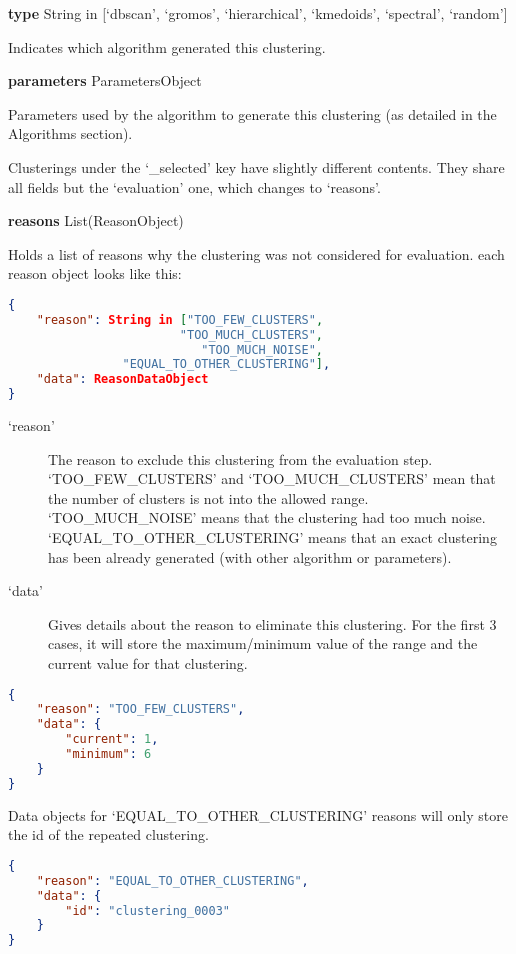 \textbf{type} String in {[}`dbscan', `gromos', `hierarchical', `kmedoids',
`spectral', `random'{]}

Indicates which algorithm generated this clustering.

\textbf{parameters} ParametersObject

Parameters used by the algorithm to generate this clustering (as detailed
in the Algorithms section).

Clusterings under the `\_selected' key have slightly different
contents. They share all fields but the `evaluation' one, which changes
to `reasons'.

\textbf{reasons } List(ReasonObject)

Holds a list of reasons why the clustering was not considered for
evaluation. each reason object looks like this:

\begin{lstlisting}[caption={Reason object},
firstnumber=1, 
language=json, 
breakatwhitespace=true 
%,literate={\_}{}{0\discretionary{_}{\\}{}}
]
{
    "reason": String in ["TOO_FEW_CLUSTERS",
                        "TOO_MUCH_CLUSTERS", 
                           "TOO_MUCH_NOISE",
                "EQUAL_TO_OTHER_CLUSTERING"],
    "data": ReasonDataObject
}
\end{lstlisting}

\begin{description}
	\item [`reason'] The reason to exclude this clustering from the evaluation
	step. `TOO\_FEW\_CLUSTERS' and `TOO\_MUCH\_CLUSTERS' mean that the
	number of clusters is not into the allowed range. `TOO\_MUCH\_NOISE'
	means that the clustering had too much noise. `EQUAL\_TO\_OTHER\_CLUSTERING'
	means that an exact clustering has been already generated (with other
	algorithm or parameters).
	\item [`data'] Gives details about the reason to eliminate this clustering.
	For the first 3 cases, it will store the maximum/minimum value of the
	range and the current value for that clustering.
\end{description}

\begin{lstlisting}[caption={This clustering was not used because it had fewer clusters \(1\) than the minimum number of clusters allowed \(6\)},firstnumber=1,language=json]
{
	"reason": "TOO_FEW_CLUSTERS",
	"data": {
		"current": 1,
		"minimum": 6
	}
}
\end{lstlisting}

Data objects for `EQUAL\_TO\_OTHER\_CLUSTERING' reasons will only
store the id of the repeated clustering.

\begin{lstlisting}[caption={},firstnumber=1,language=json]
{
	"reason": "EQUAL_TO_OTHER_CLUSTERING",
	"data": {
		"id": "clustering_0003"
	}
}
\end{lstlisting}
